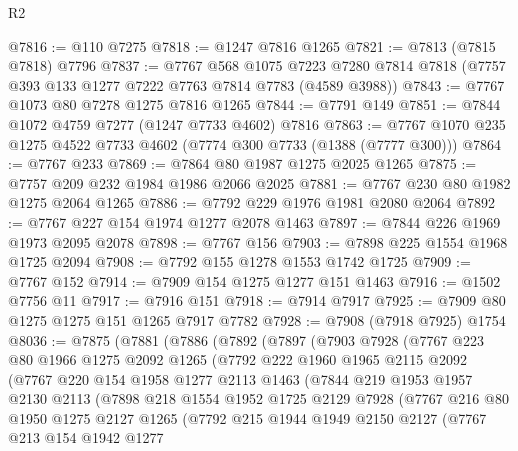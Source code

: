 \begin{lexlean}{R2}
\begin{coremodule}
@7816 := @110 @7275
@7818 := @1247 @7816 @1265
@7821 := @7813 (@7815 @7818) @7796
@7837 := @7767
    @568
    @1075
    @7223
    @7280
    @7814
    @7818
    (@7757 @393 @133 @1277 @7222 @7763 @7814 @7783 (@4589 @3988))
@7843 := @7767 @1073 @80 @7278 @1275 @7816 @1265
@7844 := @7791 @149
@7851 := @7844 @1072 @4759 @7277 (@1247 @7733 @4602) @7816
@7863 := @7767 @1070 @235 @1275 @4522 @7733 @4602 (@7774 @300 @7733 (@1388 (@7777 @300)))
@7864 := @7767 @233
@7869 := @7864 @80 @1987 @1275 @2025 @1265
@7875 := @7757 @209 @232 @1984 @1986 @2066 @2025
@7881 := @7767 @230 @80 @1982 @1275 @2064 @1265
@7886 := @7792 @229 @1976 @1981 @2080 @2064
@7892 := @7767 @227 @154 @1974 @1277 @2078 @1463
@7897 := @7844 @226 @1969 @1973 @2095 @2078
@7898 := @7767 @156
@7903 := @7898 @225 @1554 @1968 @1725 @2094
@7908 := @7792 @155 @1278 @1553 @1742 @1725
@7909 := @7767 @152
@7914 := @7909 @154 @1275 @1277 @151 @1463
@7916 := @1502 @7756 @11
@7917 := @7916 @151
@7918 := @7914 @7917
@7925 := @7909 @80 @1275 @1275 @151 @1265 @7917 @7782
@7928 := @7908 (@7918 @7925) @1754
@8036 := @7875
    (@7881
      (@7886
        (@7892
          (@7897
            (@7903
              @7928
              (@7767
                @223
                @80
                @1966
                @1275
                @2092
                @1265
                (@7792
                  @222
                  @1960
                  @1965
                  @2115
                  @2092
                  (@7767
                    @220
                    @154
                    @1958
                    @1277
                    @2113
                    @1463
                    (@7844
                      @219
                      @1953
                      @1957
                      @2130
                      @2113
                      (@7898
                        @218
                        @1554
                        @1952
                        @1725
                        @2129
                        @7928
                        (@7767
                          @216
                          @80
                          @1950
                          @1275
                          @2127
                          @1265
                          (@7792
                            @215
                            @1944
                            @1949
                            @2150
                            @2127
                            (@7767
                              @213
                              @154
                              @1942
                              @1277

\end{coremodule}
\end{lexlean}
